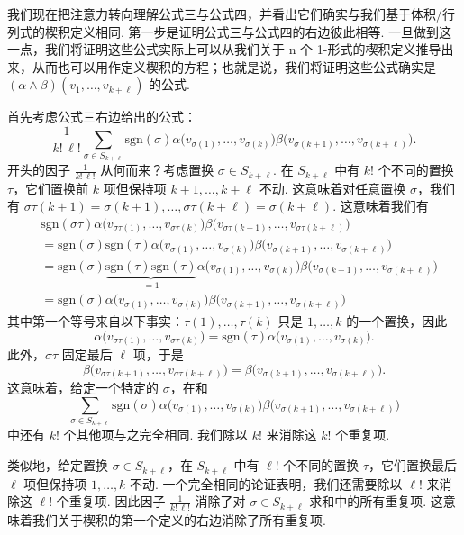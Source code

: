 我们现在把注意力转向理解公式三与公式四，并看出它们确实与我们基于体积/行列式的楔积定义相同. 第一步是证明公式三与公式四的右边彼此相等. 一旦做到这一点，我们将证明这些公式实际上可以从我们关于 n 个 1-形式的楔积定义推导出来，从而也可以用作定义楔积的方程；也就是说，我们将证明这些公式确实是 $(\alpha\wedge\beta)(v_1,\ldots,v_{k+\ell})$ 的公式.

首先考虑公式三右边给出的公式：
\[
\frac{1}{k!\,\ell!}\sum_{\sigma\in S_{k+\ell}}\mathrm{sgn}(\sigma)\alpha\bigl(v_{\sigma(1)},\ldots,v_{\sigma(k)}\bigr)\beta\bigl(v_{\sigma(k+1)},\ldots,v_{\sigma(k+\ell)}\bigr).
\]
开头的因子 $\frac{1}{k!\,\ell!}$ 从何而来？考虑置换 $\sigma\in S_{k+\ell}$. 在 $S_{k+\ell}$ 中有 $k!$ 个不同的置换 $\tau$，它们置换前 $k$ 项但保持项 $k+1,\ldots,k+\ell$ 不动. 这意味着对任意置换 $\sigma$，我们有 $\sigma\tau(k+1)=\sigma(k+1),\ldots,\sigma\tau(k+\ell)=\sigma(k+\ell)$. 这意味着我们有
\begin{align*}
&\mathrm{sgn}(\sigma\tau)\alpha\bigl(v_{\sigma\tau(1)},\ldots,v_{\sigma\tau(k)}\bigr)\beta\bigl(v_{\sigma\tau(k+1)},\ldots,v_{\sigma\tau(k+\ell)}\bigr)\\
&=\mathrm{sgn}(\sigma)\mathrm{sgn}(\tau)\alpha\bigl(v_{\sigma(1)},\ldots,v_{\sigma(k)}\bigr)\beta\bigl(v_{\sigma(k+1)},\ldots,v_{\sigma(k+\ell)}\bigr)\\
&=\mathrm{sgn}(\sigma)\underbrace{\mathrm{sgn}(\tau)\mathrm{sgn}(\tau)}_{=1}\alpha\bigl(v_{\sigma(1)},\ldots,v_{\sigma(k)}\bigr)\beta\bigl(v_{\sigma(k+1)},\ldots,v_{\sigma(k+\ell)}\bigr)\\
&=\mathrm{sgn}(\sigma)\alpha\bigl(v_{\sigma(1)},\ldots,v_{\sigma(k)}\bigr)\beta\bigl(v_{\sigma(k+1)},\ldots,v_{\sigma(k+\ell)}\bigr)
\end{align*}
其中第一个等号来自以下事实：$\tau(1),\ldots,\tau(k)$ 只是 $1,\ldots,k$ 的一个置换，因此
\[
\alpha\bigl(v_{\sigma\tau(1)},\ldots,v_{\sigma\tau(k)}\bigr)=\mathrm{sgn}(\tau)\alpha\bigl(v_{\sigma(1)},\ldots,v_{\sigma(k)}\bigr).
\]
此外，$\sigma\tau$ 固定最后 $\ell$ 项，于是
\[
\beta\bigl(v_{\sigma\tau(k+1)},\ldots,v_{\sigma\tau(k+\ell)}\bigr)=\beta\bigl(v_{\sigma(k+1)},\ldots,v_{\sigma(k+\ell)}\bigr).
\]
这意味着，给定一个特定的 $\sigma$，在和
\[
\sum_{\sigma\in S_{k+\ell}}\mathrm{sgn}(\sigma)\alpha\bigl(v_{\sigma(1)},\ldots,v_{\sigma(k)}\bigr)\beta\bigl(v_{\sigma(k+1)},\ldots,v_{\sigma(k+\ell)}\bigr)
\]
中还有 $k!$ 个其他项与之完全相同. 我们除以 $k!$ 来消除这 $k!$ 个重复项.

类似地，给定置换 $\sigma\in S_{k+\ell}$，在 $S_{k+\ell}$ 中有 $\ell!$ 个不同的置换 $\tau$，它们置换最后 $\ell$ 项但保持项 $1,\ldots,k$ 不动. 一个完全相同的论证表明，我们还需要除以 $\ell!$ 来消除这 $\ell!$ 个重复项. 因此因子 $\frac{1}{k!\,\ell!}$ 消除了对 $\sigma\in S_{k+\ell}$ 求和中的所有重复项. 这意味着我们关于楔积的第一个定义的右边消除了所有重复项.

